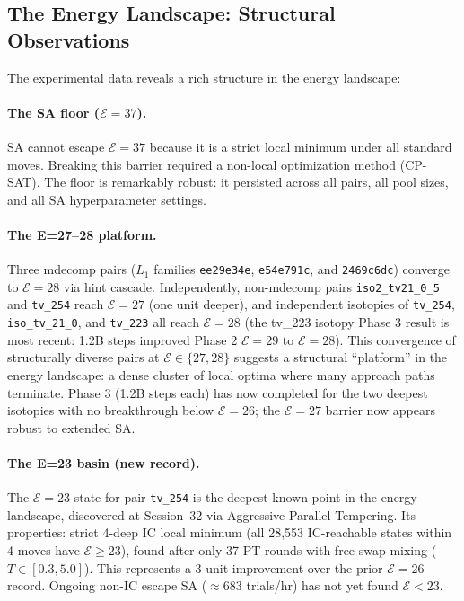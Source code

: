 \documentclass[11pt,a4paper]{article}
\theoremstyle{remark}
\newcommand{\E}{\mathcal{E}}
\begin{document}
\subsection{The Energy Landscape: Structural Observations}

The experimental data reveals a rich structure in the energy landscape:

\paragraph{The SA floor ($\E=37$).}
SA cannot escape $\E=37$ because it is a strict local minimum under all standard moves.
Breaking this barrier required a non-local optimization method (CP-SAT). The floor is
remarkably robust: it persisted across all pairs, all pool sizes, and all SA
hyperparameter settings.

\paragraph{The E=27--28 platform.}
Three mdecomp pairs ($L_1$ families \texttt{ee29e34e}, \texttt{e54e791c},
and \texttt{2469c6dc}) converge to $\E=28$ via hint cascade. Independently, non-mdecomp
pairs \texttt{iso2\_tv21\_0\_5} and \texttt{tv\_254} reach $\E=27$ (one unit deeper),
and independent isotopies of \texttt{tv\_254}, \texttt{iso\_tv\_21\_0}, and \texttt{tv\_223}
all reach $\E=28$ (the tv\_223 isotopy Phase 3 result is most recent: 1.2B steps improved
Phase 2 $\E=29$ to $\E=28$).
This convergence of structurally diverse pairs at $\E \in \{27,28\}$ suggests a structural
``platform'' in the energy landscape: a dense cluster of local optima where many approach
paths terminate. Phase 3 (1.2B steps each) has now completed for the two deepest isotopies
with no breakthrough below $\E=26$; the $\E=27$ barrier now appears robust to extended SA.

\paragraph{The E=23 basin (new record).}
The $\E=23$ state for pair \texttt{tv\_254} is the deepest known point in the energy
landscape, discovered at Session~32 via Aggressive Parallel Tempering. Its properties:
strict 4-deep IC local minimum (all 28,553 IC-reachable states within 4 moves have
$\E \geq 23$), found after only 37 PT rounds with free swap mixing ($T \in [0.3, 5.0]$).
This represents a 3-unit improvement over the prior $\E=26$ record. Ongoing non-IC
escape SA ($\approx 683$ trials/hr) has not yet found $\E < 23$.
\end{document}
